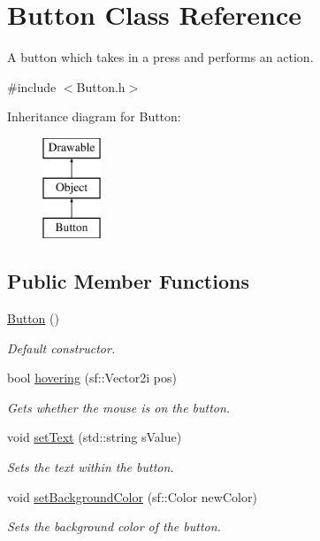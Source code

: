 \hypertarget{class_button}{}\section{Button Class Reference}
\label{class_button}


A button which takes in a press and performs an action.  




{\ttfamily \#include $<$Button.\+h$>$}

Inheritance diagram for Button\+:\begin{figure}[H]
\begin{center}
\leavevmode
\includegraphics[height=3.000000cm]{class_button}
\end{center}
\end{figure}
\subsection*{Public Member Functions}
\begin{DoxyCompactItemize}
\item 
\hyperlink{class_button_a3b36df1ae23c58aedb9e15a713159459}{Button} ()
\begin{DoxyCompactList}\small\item\em Default constructor. \end{DoxyCompactList}\item 
bool \hyperlink{class_button_ad29329cbec9b053165ffe043e30900ea}{hovering} (sf\+::\+Vector2i pos)
\begin{DoxyCompactList}\small\item\em Gets whether the mouse is on the button. \end{DoxyCompactList}\item 
void \hyperlink{class_button_adff79b7f37511a8ecd21921c13e1b0be}{set\+Text} (std\+::string s\+Value)
\begin{DoxyCompactList}\small\item\em Sets the text within the button. \end{DoxyCompactList}\item 
void \hyperlink{class_button_a44d606edb40d3bbf9140028b7fec95f4}{set\+Background\+Color} (sf\+::\+Color new\+Color)
\begin{DoxyCompactList}\small\item\em Sets the background color of the button. \end{DoxyCompactList}\end{DoxyCompactItemize}
